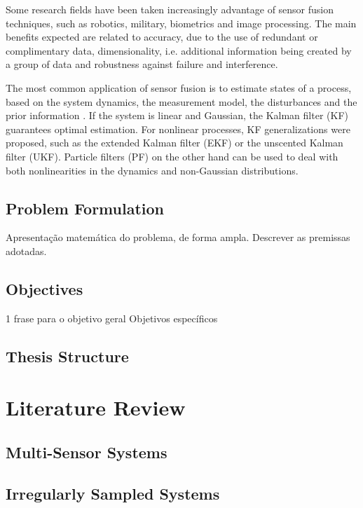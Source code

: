 Some research fields have been taken increasingly advantage of sensor fusion techniques, such as robotics, military, biometrics and image processing. The main benefits expected are related to accuracy, due to the use of redundant or complimentary data, dimensionality, i.e. additional information being created by a group of data and robustness against failure and interference.

The most common application of sensor fusion is to estimate states of a process, based on the system dynamics, the measurement model, the disturbances and the prior information \cite{Bar-Shalom2001}. If the system is linear and Gaussian, the Kalman filter (KF) guarantees optimal estimation. For nonlinear processes, KF generalizations were proposed, such as the extended Kalman filter (EKF) or the unscented Kalman filter (UKF). Particle filters (PF) on the other hand can be used to deal with both nonlinearities in the dynamics and non-Gaussian distributions.



\section{Problem Formulation}

Apresentação matemática do problema, de forma ampla. Descrever as premissas adotadas.

\section{Objectives}

1 frase para o objetivo geral
Objetivos específicos

\section{Thesis Structure}

\chapter{Literature Review}

\section{Multi-Sensor Systems}

\section{Irregularly Sampled Systems}

